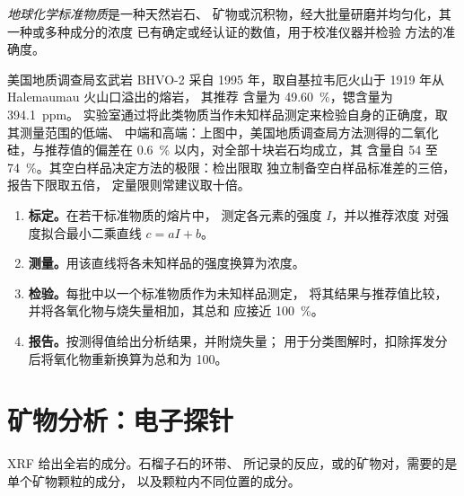 \begin{definition}[地球化学标准物质]\label{def:b2:field-lab-methods-2:rm}
\emph{地球化学标准物质}是一种天然岩石、
矿物或沉积物，经大批量研磨并均匀化，其一种或多种成分的浓度
已有确定或经认证的数值，用于校准仪器并检验
方法的准确度。
\end{definition}

美国地质调查局玄武岩 BHVO-2 采自 1995 年，取自基拉韦厄火山于 1919 年从 Halemaumau 火山口溢出的熔岩，
其推荐  含量为 \qty{49.60}{\percent}，锶含量为 \qty{394.1}{ppm}。
实验室通过将此类物质当作未知样品测定来检验自身的正确度，取其测量范围的低端、
中端和高端：上图中，美国地质调查局方法测得的二氧化硅，与推荐值的偏差在
\qty{0.6}{\percent} 以内，对全部十块岩石均成立，其  含量自 54 至
\qty{74}{\percent}。其空白样品决定方法的极限：检出限取
独立制备空白样品标准差的三倍，报告下限取五倍，
定量限则常建议取十倍。

\begin{method}[全岩分析的标定与检验]\label{met:b2:field-lab-methods-2:calibration}
\begin{enumerate}
  \item \textbf{标定。}在若干标准物质的熔片中，
        测定各元素的强度 $I$，并以推荐浓度
        对强度拟合最小二乘直线 $c = aI + b$。
  \item \textbf{测量。}用该直线将各未知样品的强度换算为浓度。
  \item \textbf{检验。}每批中以一个标准物质作为未知样品测定，
        将其结果与推荐值比较，并将各氧化物与烧失量相加，其总和
        应接近 \qty{100}{\percent}。
  \item \textbf{报告。}按测得值给出分析结果，并附烧失量；
        用于分类图解时，扣除挥发分后将氧化物重新换算为总和为 100。
\end{enumerate}
\end{method}

\section{矿物分析：电子探针}\label{sec:b2:field-lab-methods-2:microprobe}

XRF 给出全岩的成分。石榴子石的环带、
所记录的反应，或的矿物对，需要的是单个矿物颗粒的成分，
以及颗粒内不同位置的成分。


